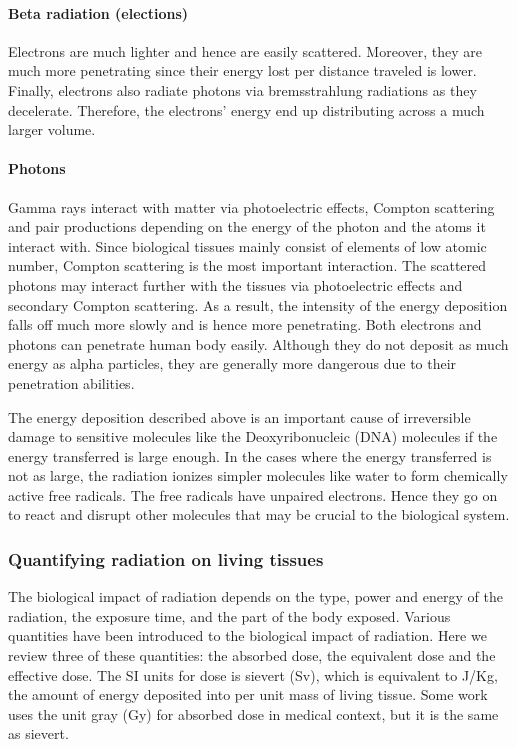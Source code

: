 \documentclass[nofootinbib,preprint,aps]{revtex4-1}
\begin{document}
        \paragraph{Beta radiation (elections)} Electrons are much lighter and hence are easily scattered.
        Moreover, they are much more penetrating since their energy lost per distance traveled is lower.
        Finally, electrons also radiate photons
        via bremsstrahlung radiations as they decelerate. Therefore, the electrons' energy end up distributing
        across a much larger volume.
        \paragraph{Photons} Gamma rays interact with matter via photoelectric effects, Compton scattering and pair productions
        depending on the energy of the photon and the atoms it interact with.
        Since biological tissues mainly consist of elements of low atomic number, Compton
        scattering is the most important interaction. The scattered photons may interact further with the tissues
        via photoelectric effects and secondary Compton scattering. As a result, the intensity of the energy deposition falls
        off much more slowly and is hence more penetrating. Both electrons and photons can penetrate human body easily.
        Although they do not deposit as much energy as alpha particles, they are generally more dangerous due to their
        penetration abilities.

        The energy deposition described above is an important cause of irreversible damage to sensitive molecules
        like the Deoxyribonucleic (DNA) molecules if the energy transferred is large enough.
        In the cases where the energy transferred is not as large, the radiation ionizes simpler molecules like water
        to form chemically active free radicals. The free radicals have unpaired electrons. Hence they go on to react
        and disrupt
        other molecules that may be crucial to the biological system.


        \subsubsection{Quantifying radiation on living tissues}
        The biological impact of radiation depends on the type, power and energy of the radiation, the
        exposure time, and the part of the body exposed. Various quantities have been introduced to
        the biological impact of radiation. Here we review three
        of these quantities: the absorbed dose, the equivalent dose and the effective dose.
        The SI units for dose is sievert (Sv), which is equivalent to J/Kg, the amount of energy deposited into
        per unit mass of living tissue. Some work uses the unit gray (Gy) for absorbed dose in medical context,
        but it is the same as sievert.
\end{document}
